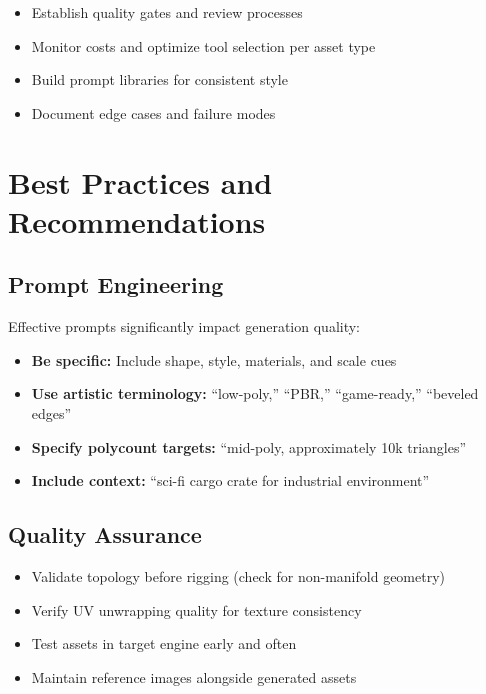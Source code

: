\documentclass[11pt]{article}
\begin{document}
\begin{itemize}[leftmargin=2em]
  \item Establish quality gates and review processes
  \item Monitor costs and optimize tool selection per asset type
  \item Build prompt libraries for consistent style
  \item Document edge cases and failure modes
\end{itemize}

\section{Best Practices and Recommendations}

\subsection{Prompt Engineering}

Effective prompts significantly impact generation quality:

\begin{itemize}[leftmargin=2em]
  \item \textbf{Be specific:} Include shape, style, materials, and scale cues
  \item \textbf{Use artistic terminology:} ``low-poly,'' ``PBR,'' ``game-ready,'' ``beveled edges''
  \item \textbf{Specify polycount targets:} ``mid-poly, approximately 10k triangles''
  \item \textbf{Include context:} ``sci-fi cargo crate for industrial environment''
\end{itemize}

\subsection{Quality Assurance}

\begin{itemize}[leftmargin=2em]
  \item Validate topology before rigging (check for non-manifold geometry)
  \item Verify UV unwrapping quality for texture consistency
  \item Test assets in target engine early and often
  \item Maintain reference images alongside generated assets
\end{itemize}
\end{document}
